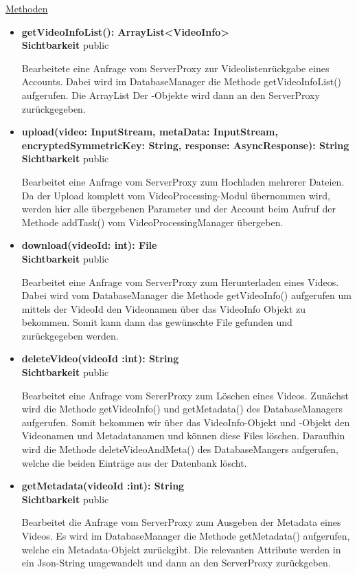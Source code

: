 \underline{Methoden}
\begin{itemize}
\itemsep0pt
\item \textbf{getVideoInfoList(): ArrayList<VideoInfo>}\hfill\\
\textbf{Sichtbarkeit} public

Bearbeitete eine Anfrage vom ServerProxy zur Videolistenrückgabe eines Accounts. Dabei wird im DatabaseManager die Methode getVideoInfoList() aufgerufen. Die ArrayList Der -Objekte wird dann an den ServerProxy zurückgegeben.    

\item \textbf{upload(video: InputStream, metaData: InputStream,
encryptedSymmetricKey: String, response: AsyncResponse): String}\hfill\\
\textbf{Sichtbarkeit} public

Bearbeitet eine Anfrage vom ServerProxy zum Hochladen mehrerer Dateien. Da der Upload komplett vom VideoProcessing-Modul übernommen wird, werden hier alle übergebenen Parameter und der Account beim Aufruf der Methode addTask() vom VideoProcessingManager übergeben.

\item \textbf{download(videoId: int): File}\hfill\\
\textbf{Sichtbarkeit} public

Bearbeitet eine Anfrage vom ServerProxy zum Herunterladen eines Videos. Dabei wird vom DatabaseManager die Methode getVideoInfo() aufgerufen um mittels der VideoId den Videonamen über das VideoInfo Objekt zu bekommen. Somit kann dann das gewünschte File gefunden und zurückgegeben werden.

\item \textbf{deleteVideo(videoId :int): String}\hfill\\
\textbf{Sichtbarkeit} public

Bearbeitet eine Anfrage vom SererProxy zum Löschen eines Videos. Zunächst wird die Methode getVideoInfo() und getMetadata() des DatabaseManagers aufgerufen. Somit bekommen wir über das VideoInfo-Objekt und -Objekt den Videonamen und Metadatanamen und können diese Files löschen. Daraufhin wird die Methode deleteVideoAndMeta() des DatabaseMangers aufgerufen, welche die beiden Einträge aus der Datenbank löscht.

\item \textbf{getMetadata(videoId :int): String}\hfill\\
\textbf{Sichtbarkeit} public

Bearbeitet die Anfrage vom ServerProxy zum Ausgeben der Metadata eines Videos. Es wird im DatabaseManager die Methode getMetadata() aufgerufen, welche ein Metadata-Objekt zurückgibt. Die relevanten Attribute werden in ein Json-String umgewandelt und dann an den ServerProxy zurückgeben.

\end{itemize}
